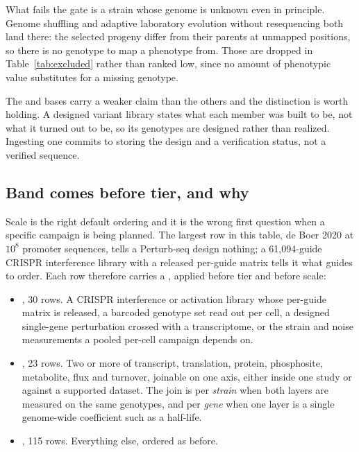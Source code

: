 What fails the gate is a strain whose genome is unknown even in principle. Genome shuffling
and adaptive laboratory evolution without resequencing both land there: the selected
progeny differ from their parents at unmapped positions, so there is no genotype to map a
phenotype from. Those are dropped in Table~\ref{tab:excluded} rather than ranked low, since
no amount of phenotypic value substitutes for a missing genotype.

The  and  bases carry a weaker claim than the
others and the distinction is worth holding. A designed variant library states what each
member was built to be, not what it turned out to be, so its genotypes are designed rather
than realized. Ingesting one commits to storing the design and a verification status, not a
verified sequence.

\subsection{Band comes before tier, and why}\label{sec:band}

Scale is the right default ordering and it is the wrong first question when a specific
campaign is being planned. The largest row in this table, de Boer 2020 at $10^8$ promoter
sequences, tells a Perturb-seq design nothing; a 61,094-guide CRISPR interference library
with a released per-guide matrix tells it what guides to order. Each row therefore carries
a , applied before tier and before scale:

\begin{itemize}[leftmargin=1.2em,itemsep=1pt,topsep=2pt]
  \item {}, 30 rows. A CRISPR interference or activation library whose
    per-guide matrix is released, a barcoded genotype set read out per cell, a designed
    single-gene perturbation crossed with a transcriptome, or the strain and noise
    measurements a pooled per-cell campaign depends on.
  \item {}, 23 rows. Two or more of transcript, translation,
    protein, phosphosite, metabolite, flux and turnover, joinable on one axis, either
    inside one study or against a supported dataset. The join is per \emph{strain} when
    both layers are measured on the same genotypes, and per \emph{gene} when one layer is
    a single genome-wide coefficient such as a half-life.
  \item {}, 115 rows. Everything else, ordered as before.
\end{itemize}

